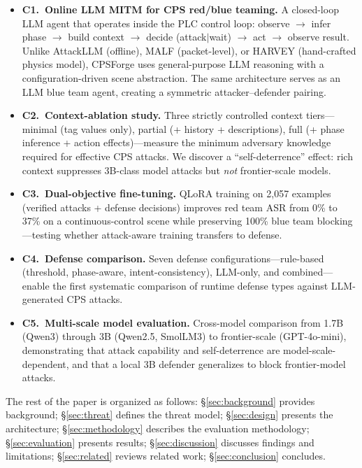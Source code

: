 \begin{itemize}[leftmargin=1.2em,nosep]
    \item \textbf{C1.~Online LLM MITM for CPS red/blue teaming.} A closed-loop LLM agent that operates inside the PLC control loop: observe $\to$ infer phase $\to$ build context $\to$ decide (attack$|$wait) $\to$ act $\to$ observe result. Unlike AttackLLM (offline), MALF (packet-level), or HARVEY (hand-crafted physics model), CPSForge uses general-purpose LLM reasoning with a configuration-driven scene abstraction. The same architecture serves as an LLM blue team agent, creating a symmetric attacker--defender pairing.

    \item \textbf{C2.~Context-ablation study.} Three strictly controlled context tiers---minimal (tag values only), partial (+ history + descriptions), full (+ phase inference + action effects)---measure the minimum adversary knowledge required for effective CPS attacks. We discover a ``self-deterrence'' effect: rich context suppresses 3B-class model attacks but \emph{not} frontier-scale models.

    \item \textbf{C3.~Dual-objective fine-tuning.} QLoRA training on 2{,}057 examples (verified attacks + defense decisions) improves red team ASR from 0\% to 37\% on a continuous-control scene while preserving 100\% blue team blocking---testing whether attack-aware training transfers to defense.

    \item \textbf{C4.~Defense comparison.} Seven defense configurations---rule-based (threshold, phase-aware, intent-consistency), LLM-only, and combined---enable the first systematic comparison of runtime defense types against LLM-generated CPS attacks.

    \item \textbf{C5.~Multi-scale model evaluation.} Cross-model comparison from 1.7B (Qwen3) through 3B (Qwen2.5, SmolLM3) to frontier-scale (GPT-4o-mini), demonstrating that attack capability and self-deterrence are model-scale-dependent, and that a local 3B defender generalizes to block frontier-model attacks.
\end{itemize}

The rest of the paper is organized as follows: \S\ref{sec:background} provides background; \S\ref{sec:threat} defines the threat model; \S\ref{sec:design} presents the architecture; \S\ref{sec:methodology} describes the evaluation methodology; \S\ref{sec:evaluation} presents results; \S\ref{sec:discussion} discusses findings and limitations; \S\ref{sec:related} reviews related work; \S\ref{sec:conclusion} concludes.
